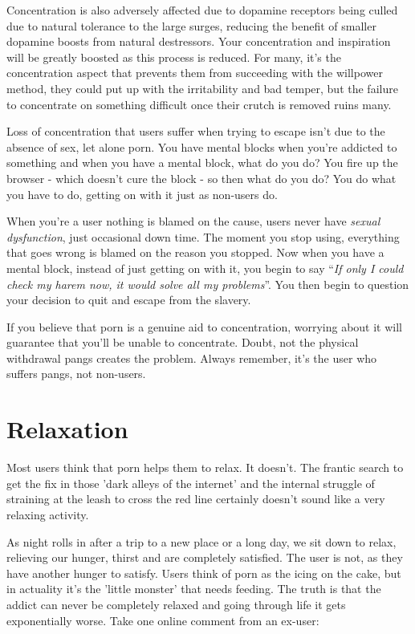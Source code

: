 \documentclass[
]{book}
\begin{document}
Concentration is also adversely affected due to dopamine receptors being culled due to natural tolerance to the large surges, reducing the benefit of smaller dopamine boosts from natural destressors. Your concentration and inspiration will be greatly boosted as this process is reduced. For many, it's the concentration aspect that prevents them from succeeding with the willpower method, they could put up with the irritability and bad temper, but the failure to concentrate on something difficult once their crutch is removed ruins many.

Loss of concentration that users suffer when trying to escape isn't due to the absence of sex, let alone porn. You have mental blocks when you're addicted to something and when you have a mental block, what do you do? You fire up the browser - which doesn't cure the block - so then what do you do? You do what you have to do, getting on with it just as non-users do.

When you're a user nothing is blamed on the cause, users never have \emph{sexual dysfunction}, just occasional down time. The moment you stop using, everything that goes wrong is blamed on the reason you stopped. Now when you have a mental block, instead of just getting on with it, you begin to say ``\emph{If only I could check my harem now, it would solve all my problems}''. You then begin to question your decision to quit and escape from the slavery.

If you believe that porn is a genuine aid to concentration, worrying about it will guarantee that you'll be unable to concentrate. Doubt, not the physical withdrawal pangs creates the problem. Always remember, it's the user who suffers pangs, not non-users.

\hypertarget{relaxation}{%
\section{Relaxation}\label{relaxation}}

Most users think that porn helps them to relax. It doesn't. The frantic search to get the fix in those 'dark alleys of the internet' and the internal struggle of straining at the leash to cross the red line certainly doesn't sound like a very relaxing activity.

As night rolls in after a trip to a new place or a long day, we sit down to relax, relieving our hunger, thirst and are completely satisfied. The user is not, as they have another hunger to satisfy. Users think of porn as the icing on the cake, but in actuality it's the 'little monster' that needs feeding. The truth is that the addict can never be completely relaxed and going through life it gets exponentially worse. Take one online comment from an ex-user:
\end{document}
